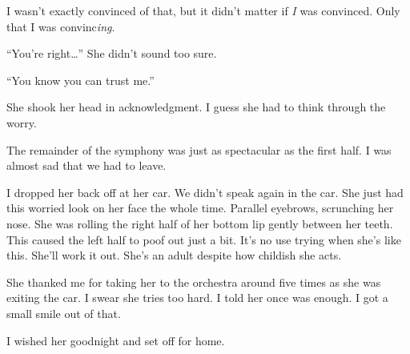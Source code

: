 \noindent
I wasn't exactly convinced of that,
but it didn't matter if \textit{I} was convinced.
Only that I was convinc\textit{ing}.
\VV


``You're right\ldots{}''  She didn't sound too sure.


``You know you can trust me.''
\VV


\noindent
She shook her head in acknowledgment.
I guess she had to think through the worry.
\VV


\noindent
The remainder of the symphony was just as spectacular
as the first half.
I was almost sad that we had to leave.
\VV


\noindent
I dropped her back off at her car.
We didn't speak again in the car.
She just had this worried look on her face
the whole time.
Parallel eyebrows, scrunching her nose.
She was rolling the right half of her bottom
lip gently between her teeth.
This caused the left half to poof out just a bit.
It's no use trying when she's like this.
She'll work it out.
She's an adult despite how childish she acts.


She thanked me for taking her to the orchestra around five times as
she was exiting the car.  I swear she tries too hard.
I told her once was enough.  I got a small smile out of that.


I wished her goodnight and set off for home.
